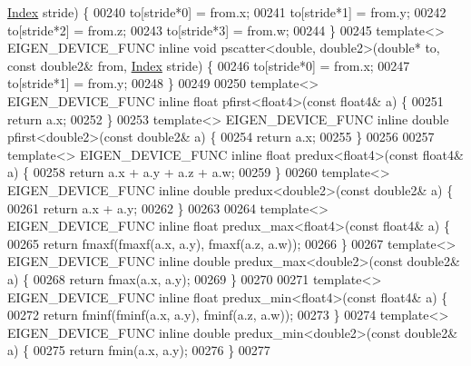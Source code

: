 \begin{DoxyCode}
      \hyperlink{namespace_eigen_a62e77e0933482dafde8fe197d9a2cfde}{Index} stride) \{
00240   to[stride*0] = from.x;
00241   to[stride*1] = from.y;
00242   to[stride*2] = from.z;
00243   to[stride*3] = from.w;
00244 \}
00245 \textcolor{keyword}{template}<> EIGEN\_DEVICE\_FUNC \textcolor{keyword}{inline} \textcolor{keywordtype}{void} pscatter<double, double2>(\textcolor{keywordtype}{double}* to, \textcolor{keyword}{const} double2& from, 
      \hyperlink{namespace_eigen_a62e77e0933482dafde8fe197d9a2cfde}{Index} stride) \{
00246   to[stride*0] = from.x;
00247   to[stride*1] = from.y;
00248 \}
00249 
00250 \textcolor{keyword}{template}<> EIGEN\_DEVICE\_FUNC \textcolor{keyword}{inline} \textcolor{keywordtype}{float}  pfirst<float4>(\textcolor{keyword}{const} float4& a) \{
00251   \textcolor{keywordflow}{return} a.x;
00252 \}
00253 \textcolor{keyword}{template}<> EIGEN\_DEVICE\_FUNC \textcolor{keyword}{inline} \textcolor{keywordtype}{double} pfirst<double2>(\textcolor{keyword}{const} double2& a) \{
00254   \textcolor{keywordflow}{return} a.x;
00255 \}
00256 
00257 \textcolor{keyword}{template}<> EIGEN\_DEVICE\_FUNC \textcolor{keyword}{inline} \textcolor{keywordtype}{float}  predux<float4>(\textcolor{keyword}{const} float4& a) \{
00258   \textcolor{keywordflow}{return} a.x + a.y + a.z + a.w;
00259 \}
00260 \textcolor{keyword}{template}<> EIGEN\_DEVICE\_FUNC \textcolor{keyword}{inline} \textcolor{keywordtype}{double} predux<double2>(\textcolor{keyword}{const} double2& a) \{
00261   \textcolor{keywordflow}{return} a.x + a.y;
00262 \}
00263 
00264 \textcolor{keyword}{template}<> EIGEN\_DEVICE\_FUNC \textcolor{keyword}{inline} \textcolor{keywordtype}{float}  predux\_max<float4>(\textcolor{keyword}{const} float4& a) \{
00265   \textcolor{keywordflow}{return} fmaxf(fmaxf(a.x, a.y), fmaxf(a.z, a.w));
00266 \}
00267 \textcolor{keyword}{template}<> EIGEN\_DEVICE\_FUNC \textcolor{keyword}{inline} \textcolor{keywordtype}{double} predux\_max<double2>(\textcolor{keyword}{const} double2& a) \{
00268   \textcolor{keywordflow}{return} fmax(a.x, a.y);
00269 \}
00270 
00271 \textcolor{keyword}{template}<> EIGEN\_DEVICE\_FUNC \textcolor{keyword}{inline} \textcolor{keywordtype}{float}  predux\_min<float4>(\textcolor{keyword}{const} float4& a) \{
00272   \textcolor{keywordflow}{return} fminf(fminf(a.x, a.y), fminf(a.z, a.w));
00273 \}
00274 \textcolor{keyword}{template}<> EIGEN\_DEVICE\_FUNC \textcolor{keyword}{inline} \textcolor{keywordtype}{double} predux\_min<double2>(\textcolor{keyword}{const} double2& a) \{
00275   \textcolor{keywordflow}{return} fmin(a.x, a.y);
00276 \}
00277 

\end{DoxyCode}

